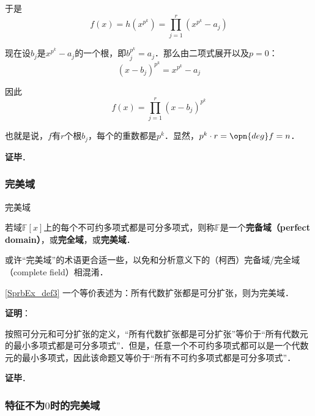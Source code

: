 于是
\begin{equation}
f(x) = h(x^{p^k}) = \prod_{j=1}^{r}(x^{p^k}-a_j)
\end{equation}

现在设$b_j$是$x^{p^k}-a_j$的一个根，即$b_j^{p^k}=a_j$．那么由二项式展开以及$p=0$：
\begin{equation}
(x-b_j)^{p^k} = x^{p^k}-a_j
\end{equation}

因此
\begin{equation}
f(x) = \prod_{j=1}^{r} (x-b_j)^{p^k}
\end{equation}

也就是说，$f$有$r$个根$b_j$，每个的重数都是$p^k$．显然，$p^k\cdot r = \opn{deg}f = n$．

\textbf{证毕}．







\subsubsection{完美域}


\begin{definition}{完美域}\label{SprbEx_def3}

若域$\mathbb{F}[x]$上的每个不可约多项式都是可分多项式，则称$\mathbb{F}$是一个\textbf{完备域（perfect domain）}，或\textbf{完全域}，或\textbf{完美域}．


\end{definition}


或许“完美域”的术语更合适一些，以免和分析意义下的（柯西）完备域/完全域（complete field）相混淆．

\begin{theorem}{}\label{SprbEx_the5}
\autoref{SprbEx_def3} 一个等价表述为：所有代数扩张都是可分扩张，则为完美域．
\end{theorem}




\textbf{证明}：

按照可分元和可分扩张的定义，“所有代数扩张都是可分扩张”等价于“所有代数元的最小多项式都是可分多项式”．但是，任意一个不可约多项式都可以是一个代数元的最小多项式，因此该命题又等价于“所有不可约多项式都是可分多项式”．

\textbf{证毕}．









\subsubsection{特征不为$0$时的完美域}


